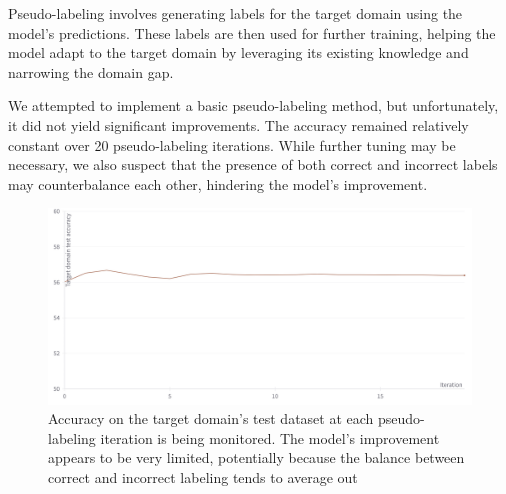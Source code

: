 Pseudo-labeling involves generating labels for the target domain using the model's predictions. These labels are then used for further training, helping the model adapt to the target domain by leveraging its existing knowledge and narrowing the domain gap.

We attempted to implement a basic pseudo-labeling method, but unfortunately, it did not yield significant improvements. The accuracy remained relatively constant over 20 pseudo-labeling iterations. While further tuning may be necessary, we also suspect that the presence of both correct and incorrect labels may counterbalance each other, hindering the model's improvement.

\begin{figure}[htbp]
    \centering
    \includegraphics[width=.5\textwidth]{pseudo_labeling.png}
    \caption{Accuracy on the target domain's test dataset at each pseudo-labeling iteration is being monitored. The model's improvement appears to be very limited, potentially because the balance between correct and incorrect labeling tends to average out}
    \label{fig:pseudo_labeling}
\end{figure}


